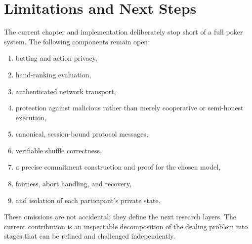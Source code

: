 \section{Limitations and Next Steps}
The current chapter and implementation deliberately stop short of a full poker
system. The following components remain open:
\begin{enumerate}
    \item betting and action privacy,
    \item hand-ranking evaluation,
    \item authenticated network transport,
    \item protection against malicious rather than merely cooperative or
    semi-honest execution,
    \item canonical, session-bound protocol messages,
    \item verifiable shuffle correctness,
    \item a precise commitment construction and proof for the chosen model,
    \item fairness, abort handling, and recovery,
    \item and isolation of each participant's private state.
\end{enumerate}

These omissions are not accidental; they define the next research layers. The
current contribution is an inspectable decomposition of the dealing problem
into stages that can be refined and challenged independently.

